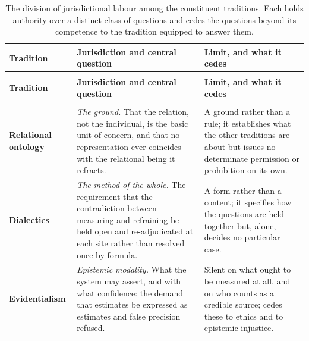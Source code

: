 \documentclass[11pt,a4paper]{article}
\begin{document}
\begin{small}
\renewcommand{\arraystretch}{1.35}
\begin{longtable}{@{}>{\raggedright\arraybackslash}p{} >{\raggedright\arraybackslash}p{} >{\raggedright\arraybackslash}p{}@{}}
\caption{The division of jurisdictional labour among the constituent traditions. Each holds authority over a distinct class of questions and cedes the questions beyond its competence to the tradition equipped to answer them.}\label{p01:tab:jurisdictions}\\
\toprule
\textbf{Tradition} & \textbf{Jurisdiction and central question} & \textbf{Limit, and what it cedes}\\
\midrule
\endfirsthead
\multicolumn{3}{@{}l}{\small\itshape Table~\ref{p01:tab:jurisdictions}, continued}\\
\toprule
\textbf{Tradition} & \textbf{Jurisdiction and central question} & \textbf{Limit, and what it cedes}\\
\midrule
\endhead
\midrule
\multicolumn{3}{r@{}}{\small\itshape continued on the next page}\\
\endfoot
\bottomrule
\endlastfoot

\textbf{Relational ontology} \parencite{huang2025relational, gergen2009relational, whitehead1978process, buber1937iandthou} & \emph{The ground.} That the relation, not the individual, is the basic unit of concern, and that no representation ever coincides with the relational being it refracts. & A ground rather than a rule; it establishes what the other traditions are about but issues no determinate permission or prohibition on its own.\\

\textbf{Dialectics} \parencite{hegel1807phenomenology, adorno1966negative} & \emph{The method of the whole.} The requirement that the contradiction between measuring and refraining be held open and re-adjudicated at each site rather than resolved once by formula. & A form rather than a content; it specifies how the questions are held together but, alone, decides no particular case.\\

\textbf{Evidentialism} \parencite{clifford1877ethics, feldman1985evidentialism} & \emph{Epistemic modality.} What the system may assert, and with what confidence: the demand that estimates be expressed as estimates and false precision refused. & Silent on what ought to be measured at all, and on who counts as a credible source; cedes these to ethics and to epistemic injustice.\\


\end{longtable}
\end{small}
\end{document}
